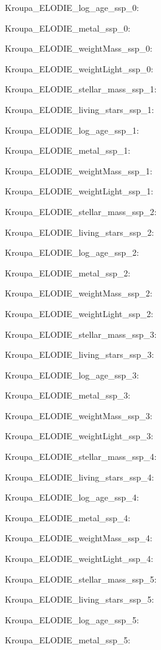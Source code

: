 \item Kroupa\_ELODIE\_log\_age\_ssp\_0: 
\item Kroupa\_ELODIE\_metal\_ssp\_0: 
\item Kroupa\_ELODIE\_weightMass\_ssp\_0: 
\item Kroupa\_ELODIE\_weightLight\_ssp\_0: 
\item Kroupa\_ELODIE\_stellar\_mass\_ssp\_1: 
\item Kroupa\_ELODIE\_living\_stars\_ssp\_1: 
\item Kroupa\_ELODIE\_log\_age\_ssp\_1: 
\item Kroupa\_ELODIE\_metal\_ssp\_1: 
\item Kroupa\_ELODIE\_weightMass\_ssp\_1: 
\item Kroupa\_ELODIE\_weightLight\_ssp\_1: 
\item Kroupa\_ELODIE\_stellar\_mass\_ssp\_2: 
\item Kroupa\_ELODIE\_living\_stars\_ssp\_2: 
\item Kroupa\_ELODIE\_log\_age\_ssp\_2: 
\item Kroupa\_ELODIE\_metal\_ssp\_2: 
\item Kroupa\_ELODIE\_weightMass\_ssp\_2: 
\item Kroupa\_ELODIE\_weightLight\_ssp\_2: 
\item Kroupa\_ELODIE\_stellar\_mass\_ssp\_3: 
\item Kroupa\_ELODIE\_living\_stars\_ssp\_3: 
\item Kroupa\_ELODIE\_log\_age\_ssp\_3: 
\item Kroupa\_ELODIE\_metal\_ssp\_3: 
\item Kroupa\_ELODIE\_weightMass\_ssp\_3: 
\item Kroupa\_ELODIE\_weightLight\_ssp\_3: 
\item Kroupa\_ELODIE\_stellar\_mass\_ssp\_4: 
\item Kroupa\_ELODIE\_living\_stars\_ssp\_4: 
\item Kroupa\_ELODIE\_log\_age\_ssp\_4: 
\item Kroupa\_ELODIE\_metal\_ssp\_4: 
\item Kroupa\_ELODIE\_weightMass\_ssp\_4: 
\item Kroupa\_ELODIE\_weightLight\_ssp\_4: 
\item Kroupa\_ELODIE\_stellar\_mass\_ssp\_5: 
\item Kroupa\_ELODIE\_living\_stars\_ssp\_5: 
\item Kroupa\_ELODIE\_log\_age\_ssp\_5: 
\item Kroupa\_ELODIE\_metal\_ssp\_5: 
